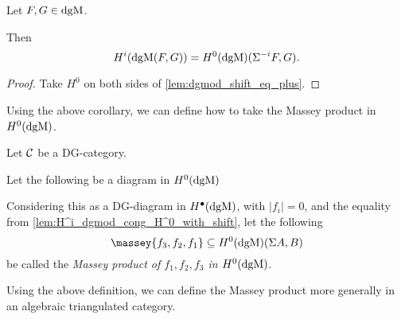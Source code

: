 \begin{lemma}
    \label{lem:H^i_dgmod_cong_H^0_with_shift}
    Let \( F, G \in \operatorname{dgM} \).

    Then
    \[
        H^i(\operatorname{dgM}(F, G)) = H^0(\operatorname{dgM})(\Sigma^{-i} F, G).
    \]
\end{lemma}
\begin{proof}
    Take \( H^0 \) on both sides of \autoref{lem:dgmod_shift_eq_plus}.
\end{proof}

Using the above corollary, we can define how to take the Massey product in \( H^0(\operatorname{dgM}) \).

\begin{definition}
    \label{def:massey_product_H^0(dgMod_dg(C))}
    Let \( {\mathcal{C}} \) be a DG-category.
    
    Let the following be a diagram in \( H^0(\operatorname{dgM}) \)
    \begin{center}
    \end{center}
    Considering this as a DG-diagram in \( H^{\bullet}(\operatorname{dgM}) \), with \( |f_i| = 0 \), and the equality from \autoref{lem:H^i_dgmod_cong_H^0_with_shift}, let the following
    \[
        \massey{f_3, f_2, f_1} \subseteq H^0(\dgM)(\Sigma A, B)
    \]
    be called the \emph{Massey product of \( f_1, f_2, f_3 \) in \( H^0(\operatorname{dgM}) \)}.
\end{definition}

Using the above definition, we can define the Massey product more generally in an algebraic triangulated category.

